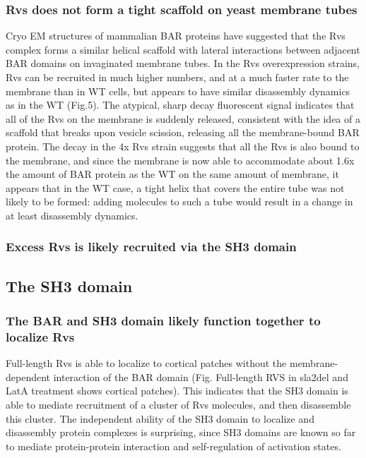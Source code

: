 \subsubsection{Rvs does not form a tight scaffold on yeast membrane tubes}
Cryo EM structures of mammalian BAR proteins have suggested that the Rvs complex forms a similar helical scaffold with lateral interactions between adjacent BAR domains on invaginated membrane tubes. In the Rvs overexpression strains, Rvs can be recruited in much higher numbers, and at a much faster rate to the membrane than in WT cells, but appears to have similar disassembly dynamics as in the WT (Fig.5). The atypical, sharp decay fluorescent signal indicates that all of the Rvs on the membrane is suddenly released, consistent with the idea of a scaffold that breaks upon vesicle scission, releasing all the membrane-bound BAR protein. The decay in the 4x Rvs strain suggests that all the Rvs is also bound to the membrane, and since the membrane is now able to accommodate about 1.6x the amount of BAR protein as the WT on the same amount of membrane, it appears that in the WT case, a tight helix that covers the entire tube was not likely to be formed: adding molecules to such a tube would result in a change in at least disassembly dynamics.

\subsubsection{Excess Rvs is likely recruited via the SH3 domain}

\subsection{The SH3 domain}

	
\subsubsection{The BAR and SH3 domain likely function together to localize Rvs}
Full-length Rvs is able to localize to cortical patches without the membrane-dependent interaction of the BAR domain (Fig. Full-length RVS in sla2del and LatA treatment shows cortical patches). This indicates that the SH3 domain is able to mediate recruitment of a cluster of Rvs molecules, and then disassemble this cluster.  The independent ability of the SH3 domain to localize and disassembly protein complexes is surprising, since SH3 domains are known so far to mediate protein-protein interaction and self-regulation of activation states. 


